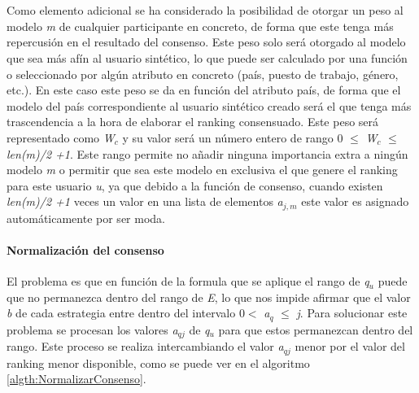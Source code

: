 \\ \\
Como elemento adicional se ha considerado la posibilidad de otorgar un peso al modelo \textit{m} de cualquier participante en concreto, de forma que este tenga más repercusión en el resultado del consenso. Este peso solo será otorgado al modelo que sea más afín al usuario sintético, lo que puede ser calculado por una función o seleccionado por algún atributo en concreto (país, puesto de trabajo, género, etc.). En este caso este peso se da en función del atributo país, de forma que el modelo del país correspondiente al usuario sintético creado será el que tenga más trascendencia a la hora de elaborar el ranking consensuado. Este peso será representado como \textit{W$_{c}$} y su valor será un número entero de rango 0 $\leq$ \textit{W$_{c}$} $\leq$ \textit{len(m)/2 +1}. Este rango permite no añadir ninguna importancia extra a ningún modelo \textit{m} o permitir que sea este modelo en exclusiva el que genere el ranking para este usuario \textit{u}, ya que debido a la función de consenso, cuando existen \textit{len(m)/2 +1} veces un valor en una lista de elementos \textit{a$_{j, m}$} este valor es asignado automáticamente por ser moda.


\paragraph{Normalización del consenso}
El problema es que en función de la formula que se aplique el rango de \textit{q$_{u}$} puede que no permanezca dentro del rango de \textit{E}, lo que nos impide afirmar que el valor \textit{b} de cada estrategia entre dentro del intervalo 0$<$
\textit{a$_{q}$ }$\leq$\textit{ j}. Para solucionar este problema se procesan los valores \textit{a$_{qj}$ } de \textit{q$_{u}$} para que estos permanezcan dentro del rango. Este proceso se realiza intercambiando el valor \textit{a$_{qj}$ } menor por el valor del ranking menor disponible, como se puede ver en el algoritmo \ref{algth:NormalizarConsenso}.

